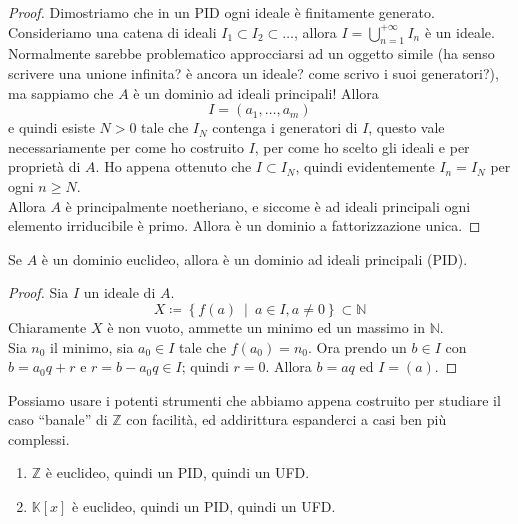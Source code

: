 \begin{proof}
	Dimostriamo che in un PID ogni ideale è finitamente generato. \\ Consideriamo una catena di ideali $I_1\subset I_2 \subset \dots$, allora $I=\bigcup_{n=1}^{+\infty}I_n$ è un ideale. Normalmente sarebbe problematico approcciarsi ad un oggetto simile (ha senso scrivere una unione infinita? è ancora un ideale? come scrivo i suoi generatori?), ma sappiamo che $A$ è un dominio ad ideali principali! Allora  
	\begin{equation*}
	I = (a_1, \dots, a_m)
	\end{equation*}
	 e quindi esiste $N>0$ tale che $I_N$ contenga i generatori di $I$, questo vale necessariamente per come ho costruito $I$, per come ho scelto gli ideali e per proprietà di $A$. Ho appena ottenuto che $I \subset I_N$, quindi evidentemente $I_n=I_N$ per ogni $n\geq N$. \\ Allora $A$ è principalmente noetheriano, e siccome è ad ideali principali ogni elemento irriducibile è primo. Allora è un dominio a fattorizzazione unica.
\end{proof}
\begin{teorema} 
	Se $A$ è un dominio euclideo, allora è un dominio ad ideali principali (PID).
\end{teorema}
\begin{proof}
	Sia $I$ un ideale di $A$.
	\begin{equation*}
	X \coloneqq \left\{f(a) \ \middle| \ a\in I, a \neq 0\right\}\subset \mathbb{N}
	\end{equation*}
	Chiaramente $X$ è non vuoto, ammette un minimo ed un massimo in $\mathbb{N}$. \\ Sia $n_0$ il minimo, sia $a_0 \in I$ tale che $f(a_0)=n_0$. Ora prendo un $b \in I$ con $b=a_0q+r$ e $r=b-a_0q\in I$; quindi $r=0$. Allora $b=aq$ ed $I=(a)$.
\end{proof}
\begin{esempio}
	Possiamo usare i potenti strumenti che abbiamo appena costruito per studiare il caso \enquote{banale} di $\mathbb{Z}$ con facilità, ed addirittura espanderci a casi ben più complessi.
	\begin{enumerate}
		\item $\mathbb{Z}$ è euclideo, quindi un PID, quindi un UFD.
		\item $\mathbb{K}[x]$ è euclideo, quindi un PID, quindi un UFD.
	\end{enumerate}
\end{esempio}
